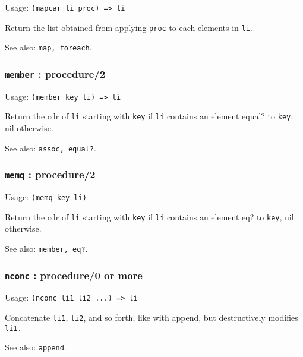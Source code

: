 \documentclass[
]{article}
\newcommand{\passthrough}[1]{#1}
\begin{document}
Usage: \passthrough{\lstinline!(mapcar li proc) => li!}

Return the list obtained from applying \passthrough{\lstinline!proc!} to
each elements in \passthrough{\lstinline!li.!}

See also: \passthrough{\lstinline!map, foreach!}.

\hypertarget{member-procedure2}{%
\subsubsection{\texorpdfstring{\texttt{member} :
procedure/2}{member : procedure/2}}\label{member-procedure2}}

Usage: \passthrough{\lstinline!(member key li) => li!}

Return the cdr of \passthrough{\lstinline!li!} starting with
\passthrough{\lstinline!key!} if \passthrough{\lstinline!li!} contains
an element equal? to \passthrough{\lstinline!key!}, nil otherwise.

See also: \passthrough{\lstinline!assoc, equal?!}.

\hypertarget{memq-procedure2}{%
\subsubsection{\texorpdfstring{\texttt{memq} :
procedure/2}{memq : procedure/2}}\label{memq-procedure2}}

Usage: \passthrough{\lstinline!(memq key li)!}

Return the cdr of \passthrough{\lstinline!li!} starting with
\passthrough{\lstinline!key!} if \passthrough{\lstinline!li!} contains
an element eq? to \passthrough{\lstinline!key!}, nil otherwise.

See also: \passthrough{\lstinline!member, eq?!}.

\hypertarget{nconc-procedure0-or-more}{%
\subsubsection{\texorpdfstring{\texttt{nconc} : procedure/0 or
more}{nconc : procedure/0 or more}}\label{nconc-procedure0-or-more}}

Usage: \passthrough{\lstinline!(nconc li1 li2 ...) => li!}

Concatenate \passthrough{\lstinline!li1!},
\passthrough{\lstinline!li2!}, and so forth, like with append, but
destructively modifies \passthrough{\lstinline!li1.!}

See also: \passthrough{\lstinline!append!}.
\end{document}
